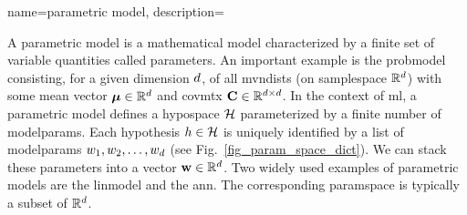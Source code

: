 {name={parametric model},
	description={
		A parametric \gls{model} is a mathematical \gls{model} characterized 
		by a finite set of variable quantities called \glspl{parameter}.
		An important example is the \gls{probmodel} consisting, for a given 
		\gls{dimension} $d$, of all \glspl{mvndist} (on \gls{samplespace} 
		$\mathbb{R}^{d}$) with some \gls{mean} \gls{vector} 
		${\bm \mu} \in \mathbb{R}^{d}$ and \gls{covmtx} ${\bf C} \in \mathbb{R}^{d \times d}$.
        In the context of \gls{ml}, a parametric \gls{model} defines a 
		\gls{hypospace} $\mathcal{H}$ parameterized by a finite number of \glspl{modelparam}.
        Each \gls{hypothesis} $h \in \mathcal{H}$ is uniquely identified by a 
		list of \glspl{modelparam} $w_{1}, w_{2}, \ldots, w_{d}$ 
		(see Fig.~\ref{fig_param_space_dict}). We can stack these \glspl{parameter} into a 
		\gls{vector} ${\bf w} \in \mathbb{R}^{d}$. Two widely used examples 
		of parametric \glspl{model} are the \gls{linmodel} and the \gls{ann}. The 
		corresponding \gls{paramspace} is typically a subset of $\mathbb{R}^{d}$.
		\begin{figure}[H]
			\begin{center}
\end{center}
\end{figure}}}
